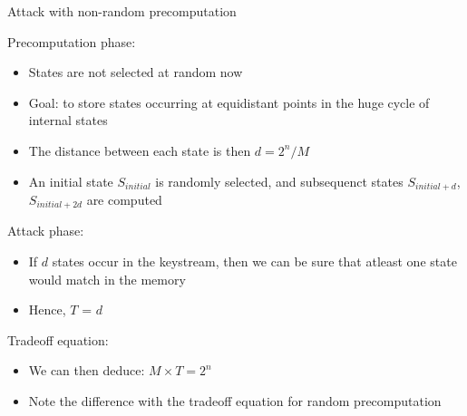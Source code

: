 \documentclass{beamer}
\begin{document}
\begin{frame}{Attack with non-random precomputation}
\begin{itemize}
\small{
	\item Precomputation phase:
	\begin{itemize}
	\item States are not selected at random now
	\item Goal: to store states occurring at equidistant points in the huge cycle of internal states
	\item The distance between each state is then $d = 2^n/M$	
	\item An initial state $S_{initial}$ is randomly selected, and subsequenct states $S_{initial+d}$, $S_{initial+2d}$ are computed

	\end{itemize}
	\item Attack phase:
	\begin{itemize}
		\item If $d$ states occur in the keystream, then we can be sure that atleast one state would match in the memory
		\item Hence, $T$ =  $d$
	\end{itemize}
	\item Tradeoff equation:
	\begin{itemize}
		\item We can then deduce: $M \times T = 2^n$
		\item Note the difference with the tradeoff equation for random precomputation
	\end{itemize}
	
}	
\end{itemize}
\end{frame}

\end{document}
